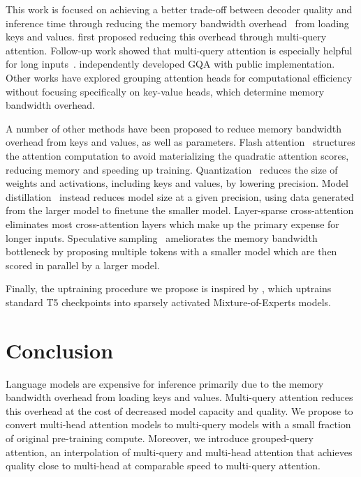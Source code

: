 This work is focused on achieving a better trade-off between decoder quality and inference time through reducing the memory bandwidth overhead~\citep{roofline} from loading keys and values. \citet{shazeer2019mq} first proposed reducing this overhead through multi-query attention. Follow-up work showed that multi-query attention is especially helpful for long inputs~\citep{palminference, dejong2022fido}. \citet{gqamrabe} independently developed GQA with public implementation. Other works have explored grouping attention heads for computational efficiency~\citep{grouptrans, gmha, pillars} without focusing specifically on key-value heads, which determine memory bandwidth overhead.

A number of other methods have been proposed to reduce memory bandwidth overhead from keys and values, as well as parameters. Flash attention~\citep{flashattention} structures the attention computation to avoid materializing the quadratic attention scores, reducing memory and speeding up training. Quantization~\citep{int8, gptq} reduces the size of weights and activations, including keys and values, by lowering precision. Model distillation~\citep{distill, distillsurvey} instead reduces model size at a given precision, using data generated from the larger model to finetune the smaller model. Layer-sparse cross-attention \citep{dejong2022fido} eliminates most cross-attention layers which make up the primary expense for longer inputs. Speculative sampling~\citep{specchen, specleviathan} ameliorates the memory bandwidth bottleneck by proposing multiple tokens with a smaller model which are then scored in parallel by a larger model. 

Finally, the uptraining procedure we propose is inspired by \citet{sparsemoe}, which uptrains standard T5 checkpoints into sparsely activated Mixture-of-Experts models.

\label{section:related}

\section{Conclusion}
\label{section:conclusion}

Language models are expensive for inference primarily due to the memory bandwidth overhead from loading keys and values. Multi-query attention reduces this overhead at the cost of decreased model capacity and quality. We propose to convert multi-head attention models to multi-query models with a small fraction of original pre-training compute. Moreover, we introduce grouped-query attention, an interpolation of multi-query and multi-head attention that achieves quality close to multi-head at comparable speed to multi-query attention. 


